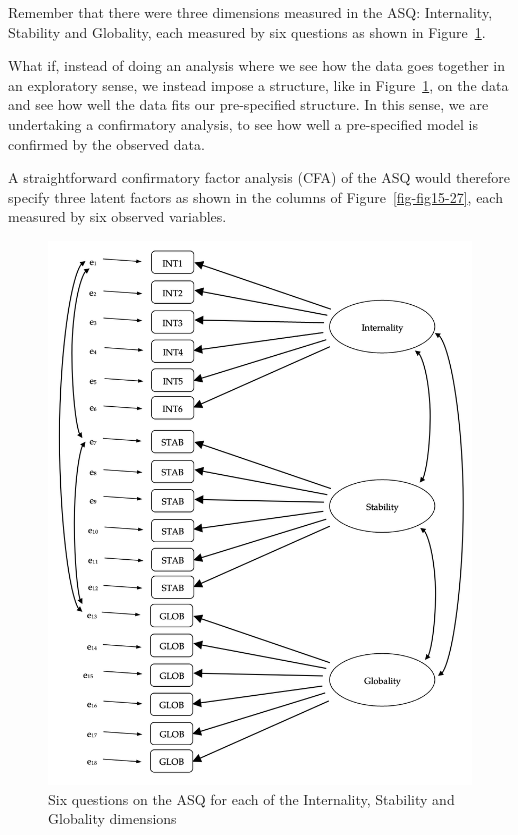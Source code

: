 \documentclass[
  a4paper,
]{book}
\begin{document}
Remember that there were three dimensions measured in the ASQ:
Internality, Stability and Globality, each measured by six questions as
shown in Figure~\ref{fig-fig15-21}.

What if, instead of doing an analysis where we see how the data goes
together in an exploratory sense, we instead impose a structure, like in
Figure~\ref{fig-fig15-21}, on the data and see how well the data fits
our pre-specified structure. In this sense, we are undertaking a
confirmatory analysis, to see how well a pre-specified model is
confirmed by the observed data.

A straightforward confirmatory factor analysis (CFA) of the ASQ would
therefore specify three latent factors as shown in the columns of
Figure~\ref{fig-fig15-27}, each measured by six observed variables.

\begin{figure}

\includegraphics[width=1\textwidth,height=\textheight]{images/fig15-21.png} \hfill{}

\caption{\label{fig-fig15-21}Six questions on the ASQ for each of the
Internality, Stability and Globality dimensions}

\end{figure}
\end{document}
